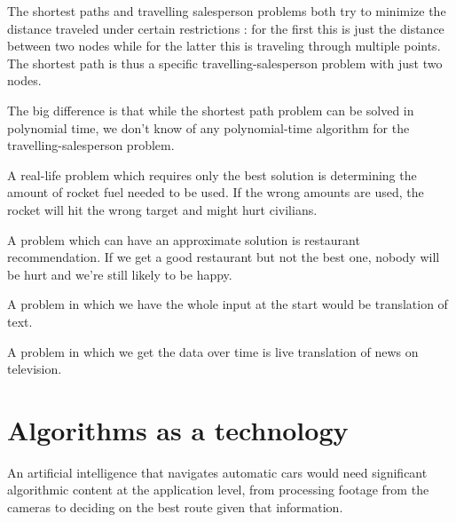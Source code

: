 \documentclass[oneside]{scrbook}
\theoremstyle{definition}
\begin{document}
\begin{exercise}
    The shortest paths and travelling salesperson problems both try to minimize the distance traveled under certain restrictions : for the first this is just the distance between two nodes while for the latter this is traveling through multiple points. The shortest path is thus a specific travelling-salesperson problem with just two nodes.

    The big difference is that while the shortest path problem can be solved in polynomial time, we don't know of any polynomial-time algorithm for the travelling-salesperson problem.
\end{exercise}

\begin{exercise}
    A real-life problem which requires only the best solution is determining the amount of rocket fuel needed to be used. If the wrong amounts are used, the rocket will hit the wrong target and might hurt civilians.

    A problem which can have an approximate solution is restaurant recommendation. If we get a good restaurant but not the best one, nobody will be hurt and we're still likely to be happy.
\end{exercise}

\begin{exercise}
    A problem in which we have the whole input at the start would be translation of text.

    A problem in which we get the data over time is live translation of news on television.
\end{exercise}

\section{Algorithms as a technology}

\begin{exercise}
    An artificial intelligence that navigates automatic cars would need significant algorithmic content at the application level, from processing footage from the cameras to deciding on the best route given that information.
\end{exercise}
\end{document}
